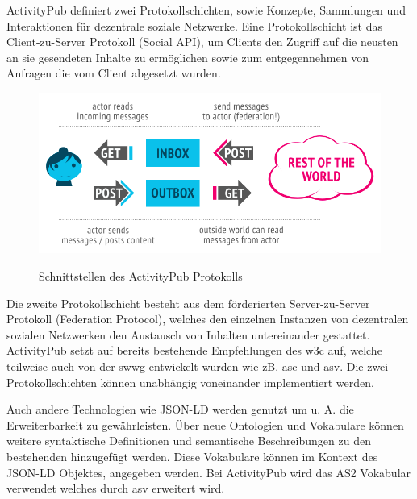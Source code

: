 {	ActivityPub definiert zwei Protokollschichten, sowie Konzepte, Sammlungen und Interaktionen für dezentrale soziale Netzwerke. Eine Protokollschicht ist das Client-zu-Server Protokoll (Social API), um Clients den Zugriff auf die neusten an sie gesendeten Inhalte zu ermöglichen sowie zum entgegennehmen von Anfragen die vom Client abgesetzt wurden\cite{activityPub}.\par 
	\begin{figure}[h]
		\begin{minipage}{\textwidth}
			\centering
			\includegraphics[scale=0.55]{figures/client-server-federated.png}
			\label{fig:client-server-federated}
			\caption{Schnittstellen des ActivityPub Protokolls}
		\end{minipage}
	\end{figure}\par
	Die zweite Protokollschicht besteht aus dem förderierten Server-zu-Server Protokoll (Federation Protocol), welches den einzelnen Instanzen von dezentralen sozialen Netzwerken den Austausch von Inhalten untereinander gestattet. ActivityPub setzt auf bereits bestehende Empfehlungen des \gls{w3c} auf, welche teilweise auch von der \gls{swwg} entwickelt wurden wie zB. \gls{asc} und \gls{asv}\cite{activityPub}. Die zwei Protokollschichten können unabhängig voneinander implementiert werden.\par
	
	Auch andere Technologien wie \gls{JSON-LD} werden genutzt um u. A. die Erweiterbarkeit zu gewährleisten. Über neue Ontologien und Vokabulare können weitere syntaktische Definitionen und semantische Beschreibungen zu den bestehenden hinzugefügt werden\cite{activityPub}. Diese Vokabulare können im Kontext des \gls{JSON-LD} Objektes, angegeben werden. Bei ActivityPub wird das \gls{AS2} Vokabular verwendet welches durch \gls{asv} erweitert wird.\par
}
